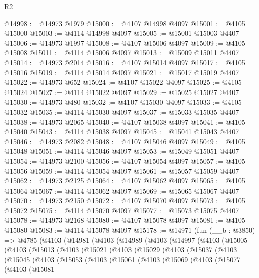 \begin{lexlean}{R2}
\begin{coremodule}
@14998 := @14973 @1979
@15000 := @4107 @14998 @4097
@15001 := @4105 @15000
@15003 := @4114 @14998 @4097
@15005 := @15001 @15003 @4407
@15006 := @14973 @1997
@15008 := @4107 @15006 @4097
@15009 := @4105 @15008
@15011 := @4114 @15006 @4097
@15013 := @15009 @15011 @4407
@15014 := @14973 @2014
@15016 := @4107 @15014 @4097
@15017 := @4105 @15016
@15019 := @4114 @15014 @4097
@15021 := @15017 @15019 @4407
@15022 := @14973 @652
@15024 := @4107 @15022 @4097
@15025 := @4105 @15024
@15027 := @4114 @15022 @4097
@15029 := @15025 @15027 @4407
@15030 := @14973 @480
@15032 := @4107 @15030 @4097
@15033 := @4105 @15032
@15035 := @4114 @15030 @4097
@15037 := @15033 @15035 @4407
@15038 := @14973 @2065
@15040 := @4107 @15038 @4097
@15041 := @4105 @15040
@15043 := @4114 @15038 @4097
@15045 := @15041 @15043 @4407
@15046 := @14973 @2082
@15048 := @4107 @15046 @4097
@15049 := @4105 @15048
@15051 := @4114 @15046 @4097
@15053 := @15049 @15051 @4407
@15054 := @14973 @2100
@15056 := @4107 @15054 @4097
@15057 := @4105 @15056
@15059 := @4114 @15054 @4097
@15061 := @15057 @15059 @4407
@15062 := @14973 @2125
@15064 := @4107 @15062 @4097
@15065 := @4105 @15064
@15067 := @4114 @15062 @4097
@15069 := @15065 @15067 @4407
@15070 := @14973 @2150
@15072 := @4107 @15070 @4097
@15073 := @4105 @15072
@15075 := @4114 @15070 @4097
@15077 := @15073 @15075 @4407
@15078 := @14973 @2168
@15080 := @4107 @15078 @4097
@15081 := @4105 @15080
@15083 := @4114 @15078 @4097
@15178 := @14971
    (fun (__b : @3850) =>
    @4785
      (@4103
        (@14981
          (@4103
            (@14989
              (@4103
                (@14997
                  (@4103
                    (@15005
                      (@4103
                        (@15013
                          (@4103
                            (@15021
                              (@4103
                                (@15029
                                  (@4103
                                    (@15037
                                      (@4103
                                        (@15045
                                          (@4103
                                            (@15053
                                              (@4103
                                                (@15061
                                                  (@4103
                                                    (@15069
                                                      (@4103
                                                        (@15077
                                                          (@4103
                                                            (@15081

\end{coremodule}
\end{lexlean}
